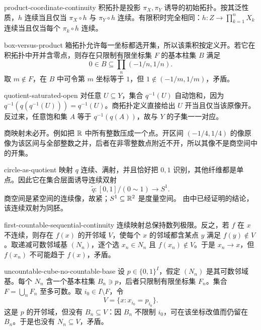 \begin{solution}{product-coordinate-continuity}
积拓扑是投影 \(\pi_X,\pi_Y\) 诱导的初始拓扑。按其泛性质，\(h\) 连续当且仅当 \(\pi_X\circ h\) 与 \(\pi_Y\circ h\) 连续。有限积时完全相同：\(h:Z\to\prod_{k=1}^nX_k\) 连续当且仅当每个 \(\pi_k\circ h\) 连续。
\end{solution}

\begin{solution}{box-versus-product}
箱拓扑允许每一坐标都选开集，所以该乘积按定义开。若它在积拓扑中开并含零点，则存在只限制有限坐标集 \(F\) 的基本柱集 \(B\) 满足
\[
 0\in B\subseteq\prod_n(-1/n,1/n).
\]
取 \(m\notin F\)，在 \(B\) 中可令第 \(m\) 坐标等于 \(1\)，但 \(1\notin(-1/m,1/m)\)，矛盾。
\end{solution}

\begin{solution}{quotient-saturated-open}
对任意 \(U\subseteq Y\)，集合 \(q^{-1}(U)\) 自动饱和，因为
\(q^{-1}(q(q^{-1}(U)))=q^{-1}(U)\)。商拓扑定义直接给出 \(U\) 开当且仅当该原像开。反过来，任意饱和集 \(A\) 等于 \(q^{-1}(q(A))\)，故与 \(Y\) 的子集一一对应。

商映射未必开。例如把 \(\mathbb{R}\) 中所有整数压成一个点。开区间 \((-1/4,1/4)\) 的像原像为该区间与全部整数之并，后者在非零整数点附近不开，所以其像不是商空间中的开集。
\end{solution}

\begin{solution}{circle-as-quotient}
映射 \(q\) 连续、满射，并且恰好把 \(0,1\) 识别，其他纤维都是单点。因此它在集合层面诱导连续双射
\[
 \widetilde q:[0,1]/(0\sim1)\longrightarrow S^1.
\]
商空间是紧空间的连续像，故紧；\(S^1\subseteq\mathbb{R}^2\) 是度量空间。
由中已经证明的结论，该连续双射为同胚。
\end{solution}

\begin{solution}{first-countable-sequential-continuity}
连续映射总保持数列极限。反之，若 \(f\) 在 \(x\) 不连续，则存在 \(f(x)\) 的开邻域 \(V\)，使每个 \(x\) 的邻域都含某点 \(y\) 满足 \(f(y)\notin V\)。取递减可数邻域基 \((N_n)\)，逐个选 \(x_n\in N_n\) 且 \(f(x_n)\notin V\)。于是 \(x_n\to x\)，但 \(f(x_n)\) 不可能趋于 \(f(x)\)，矛盾。
\end{solution}

\begin{solution}{uncountable-cube-no-countable-base}
设 \(p\in\{0,1\}^{I}\)，假定 \((N_n)\) 是其可数邻域基。每个 \(N_n\) 含一个基本柱集 \(B_n\ni p\)，后者只限制有限坐标集 \(F_n\)。集合 \(F=\bigcup_nF_n\) 至多可数。取 \(i_0\in I\setminus F\)，令
\[
 V=\{x:x_{i_0}=p_{i_0}\}.
\]
这是 \(p\) 的开邻域，但没有 \(B_n\subseteq V\)：因 \(B_n\) 不限制 \(i_0\)，可在该坐标改值而仍留在 \(B_n\)。于是也没有 \(N_n\subseteq V\)，矛盾。
\end{solution}

